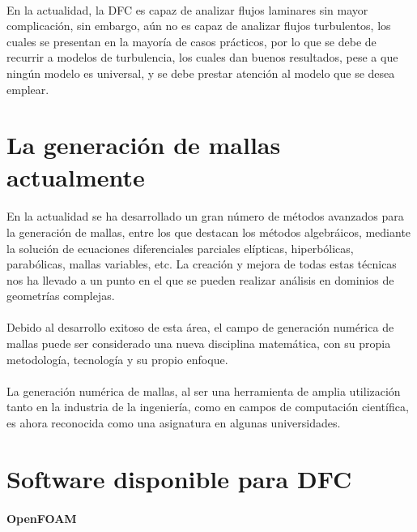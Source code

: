 \documentclass[letterpaper, openright, 12pt]{book}
\begin{document}
				\paragraph*{}
					En la actualidad, la DFC es capaz de analizar flujos laminares sin mayor complicación, sin embargo, aún no es capaz de analizar flujos turbulentos, los cuales se presentan en la mayoría de casos prácticos,  por lo que se debe de recurrir a modelos de turbulencia, los cuales dan buenos resultados, pese a que ningún modelo es universal, y se debe prestar atención al modelo que se desea emplear.\cite{cengel}
			
		\section{La generación de mallas actualmente}
				\paragraph*{}
					En la actualidad se ha desarrollado un gran número de métodos avanzados para la generación de mallas, entre los que destacan los métodos algebráicos, mediante la solución de ecuaciones diferenciales parciales elípticas, hiperbólicas, parabólicas, mallas variables, etc. La creación y mejora de todas estas técnicas nos ha llevado a un punto en el que se pueden realizar análisis en dominios de geometrías complejas.
					
				\paragraph*{}
					Debido al desarrollo exitoso de esta área, el campo de generación numérica de mallas puede ser considerado una nueva disciplina matemática, con su propia metodología, tecnología y su propio enfoque.
				
				\paragraph*{}
					La generación numérica de mallas, al ser una herramienta de amplia utilización tanto en la industria de la ingeniería, como en campos de computación científica, es ahora reconocida como una asignatura en algunas universidades.\cite{liseikin1999grid}
				
		\section{Software disponible para DFC}
				\paragraph*{OpenFOAM}
\end{document}

